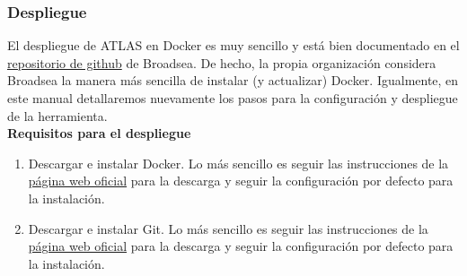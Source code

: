 \documentclass{article}
\begin{document}
\subsubsection{Despliegue}

El despliegue de ATLAS en Docker es muy sencillo y está bien documentado en el  \href{https://github.com/OHDSI/Broadsea}{repositorio de github} de Broadsea. De hecho, la propia organización considera Broadsea la manera más sencilla de instalar (y actualizar) Docker. Igualmente, en este manual detallaremos nuevamente los pasos para la configuración y despliegue de la herramienta.\\

\textbf{Requisitos para el despliegue}
\begin{enumerate}
    \item Descargar e instalar Docker. Lo más sencillo es seguir las instrucciones de la \href{https://docs.docker.com/engine/install/}{página web oficial} para la descarga y seguir la configuración por defecto para la instalación.
    
    \item Descargar e instalar Git. Lo más sencillo es seguir las instrucciones de la \href{https://git-scm.com/downloads}{página web oficial} para la descarga y seguir la configuración por defecto para la instalación.
\end{enumerate}
\end{document}
